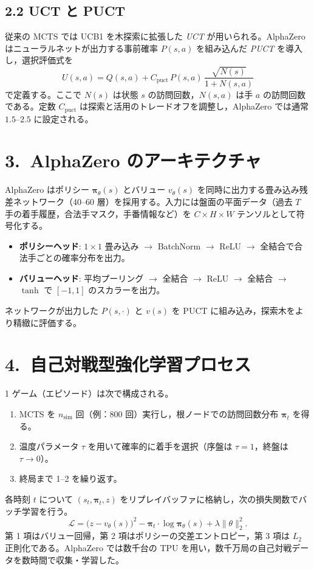 \documentclass[a4paper,12pt]{article}
\begin{document}
\begin{CJK}{UTF8}{min}
\subsection*{2.2 UCT と PUCT}
従来の MCTS では UCB1 を木探索に拡張した \textit{UCT} が用いられる。AlphaZero はニューラルネットが出力する事前確率 $P(s,a)$ を組み込んだ \textit{PUCT} を導入し，選択評価式を
\begin{equation}
U(s,a)=Q(s,a)+C_{\mathrm{puct}} \, P(s,a)\,\frac{\sqrt{N(s)}}{1+N(s,a)}
\end{equation}
で定義する。ここで $N(s)$ は状態 $s$ の訪問回数，$N(s,a)$ は手 $a$ の訪問回数である。定数 $C_{\mathrm{puct}}$ は探索と活用のトレードオフを調整し，AlphaZero では通常 $1.5\text{--}2.5$ に設定される。

\section*{3.~AlphaZero のアーキテクチャ}
AlphaZero はポリシー $\bm{\pi}_{\theta}(s)$ とバリュー $v_{\theta}(s)$ を同時に出力する畳み込み残差ネットワーク（40--60 層）を採用する。入力には盤面の平面データ（過去 $T$ 手の着手履歴，合法手マスク，手番情報など）を $C\times H\times W$ テンソルとして符号化する。

\begin{itemize}
  \item \textbf{ポリシーヘッド}: $1\times1$ 畳み込み $\rightarrow$ BatchNorm $\rightarrow$ ReLU $\rightarrow$ 全結合で合法手ごとの確率分布を出力。
  \item \textbf{バリューヘッド}: 平均プーリング $\rightarrow$ 全結合 $\rightarrow$ ReLU $\rightarrow$ 全結合 $\rightarrow$ $\tanh$ で $[-1,1]$ のスカラーを出力。
\end{itemize}

ネットワークが出力した $P(s,\cdot)$ と $v(s)$ を PUCT に組み込み，探索木をより精緻に評価する。

\section*{4.~自己対戦型強化学習プロセス}
1 ゲーム（エピソード）は次で構成される。
\begin{enumerate}
  \item MCTS を $n_{\text{sim}}$ 回（例：800 回）実行し，根ノードでの訪問回数分布 $\bm{\pi}_t$ を得る。
  \item 温度パラメータ $\tau$ を用いて確率的に着手を選択（序盤は $\tau=1$，終盤は $\tau\to0$）。
  \item 終局まで 1--2 を繰り返す。
\end{enumerate}
各時刻 $t$ について $(s_t,\bm{\pi}_t,z)$ をリプレイバッファに格納し，次の損失関数でバッチ学習を行う。
\begin{equation}
\mathcal{L}=\bigl(z-v_{\theta}(s)\bigr)^{2}-\bm{\pi}_t\cdot\log \bm{\pi}_{\theta}(s)+\lambda\lVert\theta\rVert_{2}^{2}.
\end{equation}
第 1 項はバリュー回帰，第 2 項はポリシーの交差エントロピー，第 3 項は $L_2$ 正則化である。AlphaZero では数千台の TPU を用い，数千万局の自己対戦データを数時間で収集・学習した。


\end{CJK}
\end{document}
